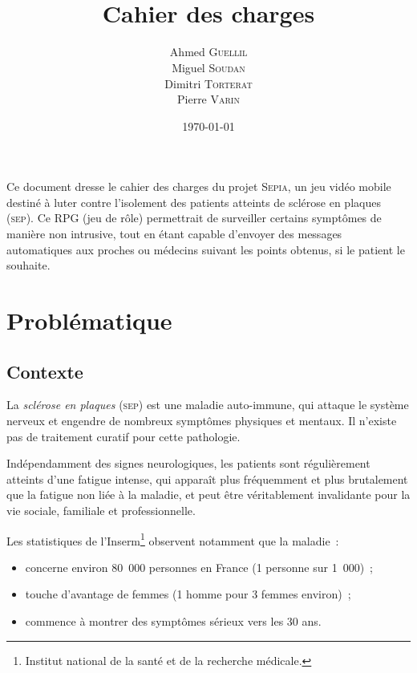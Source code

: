 \documentclass[a4paper,12pt,francais]{article}
\title{\Sepia\\Cahier des charges}
\author{Ahmed \textsc{Guellil}\\
  Miguel \textsc{Soudan}\\
  Dimitri \textsc{Torterat}\\
  Pierre \textsc{Varin}
}
\date{\today} %
\newcommand{\SEP}{\textsc{sep}\xspace}
\newcommand{\Sepia}{\textsc{Sepia}\xspace}
\begin{document}
\renewcommand{\labelitemii}{–}
\renewcommand{\contentsname}{Sommaire}

\maketitle

Ce document dresse le cahier des charges du projet \Sepia, un jeu vidéo mobile destiné à luter contre l’isolement des patients atteints de sclérose en plaques (\SEP). Ce RPG (jeu de rôle) permettrait de surveiller certains symptômes de manière non intrusive, tout en étant capable d’envoyer des messages automatiques aux proches ou médecins suivant les points obtenus, si le patient le souhaite.


\newpage
\tableofcontents
\newpage

\section{Problématique}
\subsection{Contexte}

La \emph{sclérose en plaques} (\SEP{}) est une maladie auto-immune, qui attaque le système nerveux et engendre de nombreux symptômes physiques et mentaux. Il n’existe pas de traitement curatif pour cette pathologie.

Indépendamment des signes neurologiques, les patients sont régulièrement atteints d’une fatigue intense, qui apparaît plus fréquemment et plus brutalement que la fatigue non liée à la maladie, et peut être véritablement invalidante pour la vie sociale, familiale et professionnelle.

Les statistiques de l’Inserm\footnote{Institut national de la santé et de la recherche médicale.} observent notamment que la maladie~:
\begin{itemize}
\item concerne environ 80~000 personnes en France (1 personne sur 1~000)~;
\item touche d’avantage de femmes (1 homme pour 3 femmes environ)~;
\item commence à montrer des symptômes sérieux vers les 30 ans.
\end{itemize}
\end{document}
